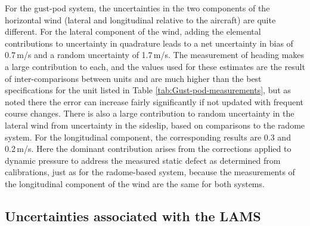 \documentclass[12pt,twoside,english]{article}\usepackage[]{graphicx}\usepackage[]{color}
\let\OrgIndex\index
\renewcommand*{\index}[1]{\OrgIndex{#1}}
\begin{document}
{{For the gust-pod system, the uncertainties in the two components of the horizontal wind (lateral  and longitudinal relative to the aircraft) are quite different. For the lateral component of the wind, adding the elemental contributions to uncertainty in quadrature leads to a net uncertainty in bias of 0.7\,m/s and a random uncertainty of 1.7\,m/s. The measurement of heading makes a large contribution to each, and the values used for these estimates are the result of inter-comparisons between units and are much higher than the best specifications for the unit listed in Table \ref{tab:Gust-pod-measurements}, but as noted there the error can increase fairly significantly if not updated with frequent course changes. There is also a large contribution to random uncertainty in the lateral wind from uncertainty in the sideslip, based on comparisons to the radome system. For the longitudinal component, the corresponding results are 0.3 and 0.2\,m/s. Here the dominant contribution arises from the corrections applied to dynamic pressure to address the measured static defect as determined from calibrations, just as for the radome-based system, because the measurements of the longitudinal component of the wind are the same for both systems. 


\subsection{Uncertainties associated with the LAMS\label{sub:LAMS-uncertainty}}

}}
\end{document}
